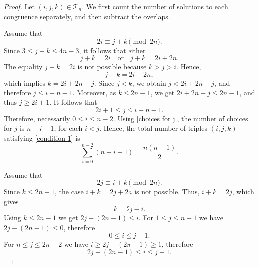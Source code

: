 \documentclass[11pt,reqno]{amsart}
\numberwithin{equation}{section}
\begin{document}
\begin{proof} Let $(i,j,k) \in \mathcal{T}_n$. We first count the number of solutions to each congruence separately, and then subtract the overlaps.

Assume that \begin{equation}\label{condition-1}
    2i \equiv j+k \pmod{2n}.
\end{equation} Since $3 \le j + k \le 4n - 3$, it follows that either
$$j + k = 2i \quad \text{or} \quad j + k = 2i + 2n.$$
The equality $j + k = 2i$ is not possible because $k > j > i$. Hence, $$j+k=2i+2n,$$
 which  implies $k=2i+2n-j$. Since $j<k$, we obtain  
$j<2i+2n-j$, and therefore $j\leq i+n-1$. Moreover, as $k\leq 2n-1$, we get  $2i+2n-j\leq 2n-1$, and thus $j\geq  2i+1$. It follows that  
\begin{equation}\label{choices for j}
    2i+1 \leq j \leq i+n-1.
\end{equation}
Therefore, necessarily
$0\leq i\leq n-2$. Using \eqref{choices for j}, the number of choices for  $j$ is $n-i-1$, for each $i<j$. Hence, the total number of triples $(i,j,k)$ satisfying  \eqref{condition-1} is \begin{equation}\label{2.3.1}
    \sum_{i=0}^{n-2}(n-i-1)=\frac{n(n-1)}{2}.
\end{equation}


Assume that \begin{equation}\label{conditon-2}
    2j \equiv i+k \pmod{2n}.
\end{equation}  Since $k\leq 2n-1$, the case $i+k=2j+2n$ is not possible. Thus,  $i+k=2j$, which gives $$k=2j-i.$$
Using $k\leq 2n-1$ we get $2j-(2n-1)\leq i$. For $1\leq j\leq n-1$ we have $2j-(2n-1)\leq 0$,  therefore \begin{equation}\label{condition-2.1}
    0\leq i \leq j-1.
\end{equation}
For $n\leq j\leq 2n-2$ we have $i\geq 2j-(2n-1)\geq 1$, therefore \begin{equation}\label{condition-2.2}
    2j-(2n-1)\leq i \leq j-1.
\end{equation}


\end{proof}
\end{document}
